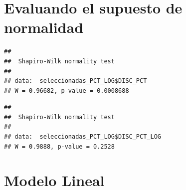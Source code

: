 \documentclass[11pt,]{article}
\newenvironment{Shaded}{\begin{snugshade}}{\end{snugshade}}
\newcommand{\KeywordTok}[1]{\textcolor[rgb]{0.13,0.29,0.53}{\textbf{#1}}}
\newcommand{\StringTok}[1]{\textcolor[rgb]{0.31,0.60,0.02}{#1}}
\newcommand{\OperatorTok}[1]{\textcolor[rgb]{0.81,0.36,0.00}{\textbf{#1}}}
\newcommand{\NormalTok}[1]{#1}
\begin{document}
\section{Evaluando el supuesto de
normalidad}\label{evaluando-el-supuesto-de-normalidad}

\begin{Shaded}
\end{Shaded}

\begin{verbatim}
## 
##  Shapiro-Wilk normality test
## 
## data:  seleccionadas_PCT_LOG$DISC_PCT
## W = 0.96682, p-value = 0.0008688
\end{verbatim}

\begin{Shaded}
\end{Shaded}

\begin{verbatim}
## 
##  Shapiro-Wilk normality test
## 
## data:  seleccionadas_PCT_LOG$DISC_PCT_LOG
## W = 0.9888, p-value = 0.2528
\end{verbatim}

\section{Modelo Lineal}\label{modelo-lineal}

\begin{Shaded}
\end{Shaded}
\end{document}
